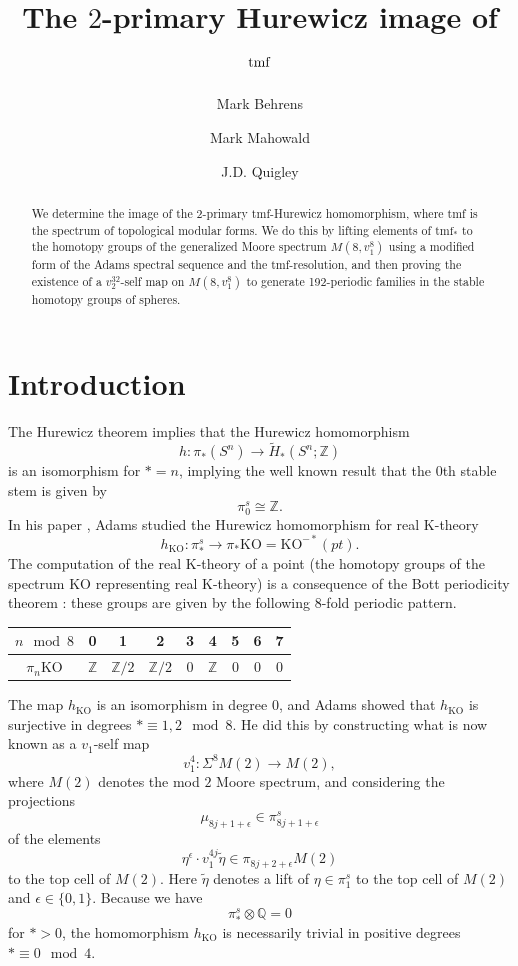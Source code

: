 \documentclass[10pt]{amsart}
\title{The $2$-primary Hurewicz image of $\tmf$}
\author{Mark Behrens}
\author{Mark Mahowald}
\author{J.D. Quigley}
\newcommand{\mr}[1]{\mathrm{#1}}
\newcommand{\td}[1]{\widetilde{#1}}
\newcommand{\ZZ}{\mathbb{Z}}
\newcommand{\QQ}{\mathbb{Q}}
\newcommand{\tmf}{\mathrm{tmf}}
\newcommand{\KO}{\mr{KO}}
\theoremstyle{definition}
\numberwithin{equation}{section}
\numberwithin{figure}{section}
\begin{document}
\begin{abstract}
We determine the image of the 2-primary tmf-Hurewicz homomorphism, where tmf is the spectrum of topological modular forms.  We do this by lifting elements of $\tmf_*$ to the homotopy groups of the generalized Moore spectrum $M(8,v_1^8)$ using a modified form of the Adams spectral sequence and the tmf-resolution, and then proving the existence of a $v_2^{32}$-self map on $M(8,v_1^8)$ to generate 192-periodic families in the stable homotopy groups of spheres.   
\end{abstract}

\maketitle
\tableofcontents

\section{Introduction}\label{sec:intro}

The Hurewicz theorem implies that the Hurewicz homomorphism
$$ h: \pi_*(S^n) \rightarrow \td{H}_*(S^n; \ZZ)$$
is an isomorphism for $* = n$, implying the well known result that the $0$th stable stem is given by
$$ \pi_0^s \cong \ZZ. $$
In his paper \cite{Adams}, Adams studied the Hurewicz homomorphism for real K-theory
$$
h_{\KO}: \pi^s_* \rightarrow \pi_*\KO = \KO^{-*}(pt).
$$
The computation of the real K-theory of a point (the homotopy groups of the spectrum $\KO$ representing real K-theory) 
is a consequence of the Bott periodicity theorem \cite{Bott}: these groups are given by the following 8-fold periodic pattern.
\begin{center}
\begin{tabular}{c|cccccccc}\hline
$n \mod 8$ & 0 & 1 & 2 & 3 & 4 & 5 & 6 & 7
\\ \hline
$\pi_n\KO$ & $\ZZ$ & $\ZZ/2$ & $\ZZ/2$ & 0 & $\ZZ$ & 0 & 0 & 0 
\\ \hline
\end{tabular} 
\end{center}
The map $h_{\KO}$ is an isomorphism in degree $0$, and Adams showed that $h_{\KO}$ is surjective in degrees $* \equiv 1,2 \mod 8$.  He did this by constructing what is now known as a $v_1$-self map
$$ v_1^4: \Sigma^{8}M(2) \rightarrow M(2), $$
where $M(2)$ denotes the mod $2$ Moore spectrum, and considering the projections
$$ \mu_{8j +1 + \epsilon} \in \pi^s_{8j+1+\epsilon} $$
of the elements
\begin{equation}\label{eq:mun}
 \eta^{\epsilon} \cdot v_1^{4j}\td{\eta} \in \pi_{8j+2 + \epsilon} M(2)
\end{equation}
to the top cell of $M(2)$. Here $\td{\eta}$ denotes a lift of $\eta \in \pi_1^s$ to the top cell of $M(2)$ and $\epsilon \in \{0,1\}$.  Because we have 
$$ \pi_*^s \otimes \QQ = 0 $$
for $* > 0$, the homomorphism $h_{\KO}$ is necessarily trivial in positive degrees $* \equiv 0 \mod 4$.
 
\end{document}
